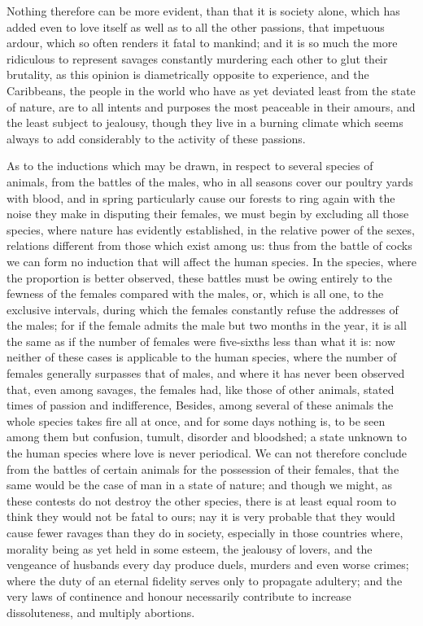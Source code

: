 \documentclass[11pt,twocolumn]{ltugboat}
\begin{document}
Nothing therefore can be more evident, than that it is society alone,
which has added even to love itself as well as to all the other
passions, that impetuous ardour, which so often renders it fatal to
mankind; and it is so much the more ridiculous to represent savages
constantly murdering each other to glut their brutality, as this
opinion is diametrically opposite to experience, and the Caribbeans,
the people in the world who have as yet deviated least from the state
of nature, are to all intents and purposes the most peaceable in their
amours, and the least subject to jealousy, though they live in a
burning climate which seems always to add considerably to the activity
of these passions.

As to the inductions which may be drawn, in respect to several species
of animals, from the battles of the males, who in all seasons cover
our poultry yards with blood, and in spring particularly cause our
forests to ring again with the noise they make in disputing their
females, we must begin by excluding all those species, where nature
has evidently established, in the relative power of the sexes,
relations different from those which exist among us: thus from the
battle of cocks we can form no induction that will affect the human
species. In the species, where the proportion is better observed,
these battles must be owing entirely to the fewness of the females
compared with the males, or, which is all one, to the exclusive
intervals, during which the females constantly refuse the addresses of
the males; for if the female admits the male but two months in the
year, it is all the same as if the number of females were five-sixths
less than what it is: now neither of these cases is applicable to the
human species, where the number of females generally surpasses that of
males, and where it has never been observed that, even among savages,
the females had, like those of other animals, stated times of passion
and indifference, Besides, among several of these animals the whole
species takes fire all at once, and for some days nothing is, to be
seen among them but confusion, tumult, disorder and bloodshed; a state
unknown to the human species where love is never periodical. We can
not therefore conclude from the battles of certain animals for the
possession of their females, that the same would be the case of man in
a state of nature; and though we might, as these contests do not
destroy the other species, there is at least equal room to think they
would not be fatal to ours; nay it is very probable that they would
cause fewer ravages than they do in society, especially in those
countries where, morality being as yet held in some esteem, the
jealousy of lovers, and the vengeance of husbands every day produce
duels, murders and even worse crimes; where the duty of an eternal
fidelity serves only to propagate adultery; and the very laws of
continence and honour necessarily contribute to increase
dissoluteness, and multiply abortions.
\end{document}

